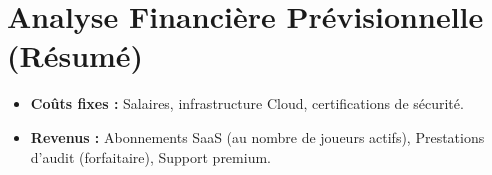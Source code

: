\documentclass[12pt,a4paper]{article}
\begin{document}
\section{Analyse Financière Prévisionnelle (Résumé)}
\begin{itemize}
    \item \textbf{Coûts fixes :} Salaires, infrastructure Cloud, certifications de sécurité.
    \item \textbf{Revenus :} Abonnements SaaS (au nombre de joueurs actifs), Prestations d'audit (forfaitaire), Support premium.
\end{itemize}
\end{document}
